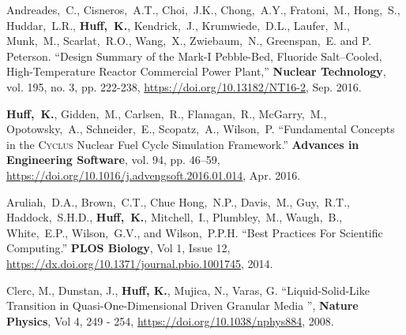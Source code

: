 \documentclass[margin,line]{resume}
\newcommand{\Cyclus}{\textsc{Cyclus}\xspace}%
\begin{document}
\begin{resume}
\begin{bibenum}
      \item Andreades,~C., Cisneros,~A.T., Choi,~J.K., Chong,~A.Y., 
              Fratoni,~M., Hong,~S., Huddar,~L.R., \textbf{Huff,~K.}, Kendrick,~J., 
              Krumwiede,~D.L., Laufer,~M., Munk,~M., Scarlat,~R.O., Wang,~X., 
              Zwiebaum,~N., Greenspan,~E. and P. Peterson.  ``Design Summary of 
              the Mark-I Pebble-Bed, Fluoride Salt–Cooled, High-Temperature 
              Reactor Commercial Power Plant,'' \textbf{Nuclear Technology}, 
              vol. 195, no. 3, pp. 222-238,
              \url{https://doi.org/10.13182/NT16-2},
              Sep. 2016.
       \item \textbf{Huff,~K.}, Gidden,~M., Carlsen,~R., Flanagan,~R., 
               McGarry,~M., Opotowsky,~A., Schneider,~E., Scopatz,~A., 
               Wilson,~P.  ``Fundamental Concepts in the \Cyclus Nuclear Fuel 
               Cycle Simulation Framework.'' \textbf{Advances in Engineering 
               Software}, vol. 94, pp. 46–59, 
               \url{https://doi.org/10.1016/j.advengsoft.2016.01.014},
               Apr. 2016.
       \item Aruliah,~D.A., Brown,~C.T., Chue Hong,~N.P., Davis,~M., Guy,~R.T., 
               Haddock,~S.H.D., \textbf{Huff,~K.}, Mitchell,~I., Plumbley,~M., 
               Waugh,~B., White,~E.P., Wilson,~G.V., and Wilson,~P.P.H.  ``Best 
               Practices For Scientific Computing.'' \textbf{PLOS Biology}, Vol 
               1, Issue 12, \url{https://dx.doi.org/10.1371/journal.pbio.1001745}, 
               2014. 
       \item Clerc, M., Dunstan, J., \textbf{Huff, K.}, Mujica, N., Varas, G.  
               ``Liquid-Solid-Like Transition in Quasi-One-Dimensional Driven 
               Granular Media '',  \textbf{Nature Physics}, Vol 4, 249 - 254, 
               \url{https://doi.org/10.1038/nphys884}, 2008.
      \end{bibenum}
      \vspace{2mm} %

\end{resume}
\end{document}
